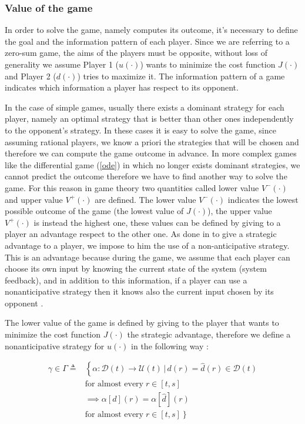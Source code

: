 \subsubsection{Value of the game}
In order to solve the game, namely computes its outcome, it's necessary to define the goal and the information pattern of each player. Since we are referring to a zero-sum game, the aims of the players must be opposite, without loss of generality we assume Player 1 ($u(\cdot)$) wants to minimize the cost function $J(\cdot)$ and Player 2 ($d(\cdot)$) tries to maximize it. The information pattern of a game indicates which information a player has respect to its opponent.

In the case of simple games, usually there exists a dominant strategy for each player, namely an optimal strategy that is better than other ones independently to the opponent's strategy. In these cases it is easy to solve the game, since assuming rational players, we know a priori the strategies that will be chosen and therefore we can compute the game outcome in advance. In more complex games like the differential game (\ref{ode}) in which no longer exists dominant strategies, we cannot predict the outcome therefore we have to find another way to solve the game. For this reason in game theory two quantities called lower value $V^-(\cdot)$ and upper value $V^+(\cdot)$ are defined. The lower value $V^-(\cdot)$ indicates the lowest possible outcome of the game (the lowest value of $J(\cdot)$), the upper value $V^+(\cdot)$ is instead the highest one, these values can be defined by giving to a player an advantage respect to the other one. As done in \cite{evans} \cite{reach_avoid_with_dist} \cite{brief_intro} to give a strategic advantage to a player, we impose to him the use of a non-anticipative strategy. This is an advantage because during the game, we assume that each player can choose its own input by knowing the current state of the system (system feedback), and in addition to this information, if a player can use a nonanticipative strategy then it knows also the current input chosen by its opponent \cite{mitchell_time_dep_HJ}.

The lower value of the game is defined by giving to the player that wants to minimize the cost function $J(\cdot)$ the strategic advantage, therefore we define a nonanticipative strategy for $u(\cdot)$ in the following way \cite{evans}:

\begin{equation}
	\label{eq:non_ant_stra_u}
	\begin{split}
		\gamma \in \Gamma \triangleq 
		& \left\{ 
			\alpha : \mathcal{D}(t) \rightarrow \mathcal{U}(t)\,|\,d(r) = \hat{d}(r) \in \mathcal{D}(t)
		\right. \\ 
		& \textrm{for almost every} \;r \in [t,s] \\
		& \implies \alpha[d](r)= \alpha[\hat{d}](r) \\
		& \left. 
			\textrm{for almost every} \; r \in [t,s] 
		\right\}  
	\end{split}
\end{equation}

